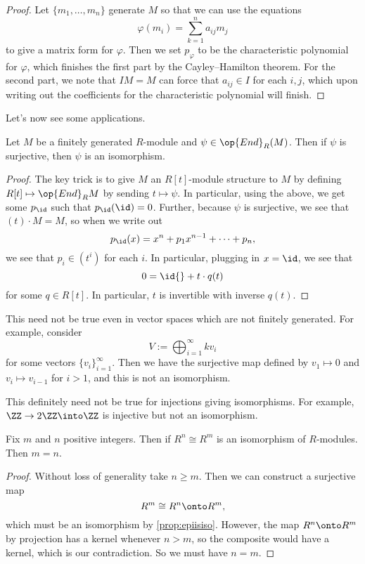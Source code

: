 \begin{proof}
	Let $\{m_1,\ldots,m_n\}$ generate $M$ so that we can use the equations
	\[\varphi(m_i)=\sum_{k=1}^na_{ij}m_j\]
	to give a matrix form for $\varphi$. Then we set $p_\varphi$ to be the characteristic polynomial for $\varphi$, which finishes the first part by the Cayley--Hamilton theorem. For the second part, we note that $IM=M$ can force that $a_{ij}\in I$ for each $i,j$, which upon writing out the coefficients for the characteristic polynomial will finish.
\end{proof}
Let's now see some applications.
\begin{proposition} \label{prop:epiisiso}
	Let $M$ be a finitely generated $R$-module and $\psi\in\op{End}_R(M)$. Then if $\psi$ is surjective, then $\psi$ is an isomorphism.
\end{proposition}
\begin{proof}
	The key trick is to give $M$ an $R[t]$-module structure to $M$ by defining $R[t]\mapsto\op{End}_RM$ by sending $t\mapsto\psi$.
	In particular, using the above, we get some $p_{\id}$ such that $p_{\id}({\id})=0$.
	Further, because $\psi$ is surjective, we see that $(t)\cdot M=M$, so when we write out
	\[p_{\id}(x)=x^n+p_1x^{n-1}+\cdots+p_n,\]
	we see that $p_i\in\left(t^i\right)$ for each $i$. In particular, plugging in $x=\id$, we see that
	\[0=\id{}+t\cdot q(t)\]
	for some $q\in R[t]$. In particular, $t$ is invertible with inverse $q(t)$.
\end{proof}
\begin{remark}
	This need not be true even in vector spaces which are not finitely generated. For example, consider
	\[V:=\bigoplus_{i=1}^\infty kv_i\]
	for some vectors $\{v_i\}_{i=1}^\infty$. Then we have the surjective map defined by $v_1\mapsto0$ and $v_i\mapsto v_{i-1}$ for $i>1$, and this is not an isomorphism.
\end{remark}
\begin{remark}
	This definitely need not be true for injections giving isomorphisms. For example, $\ZZ\to2\ZZ\into\ZZ$ is injective but not an isomorphism.
\end{remark}
\begin{corollary}
	Fix $m$ and $n$ positive integers. Then if $R^n\cong R^m$ is an isomorphism of $R$-modules. Then $m=n$.
\end{corollary}
\begin{proof}
	Without loss of generality take $n\ge m$. Then we can construct a surjective map
	\[R^m\cong R^n\onto R^m,\]
	which must be an isomorphism by \autoref{prop:epiisiso}. However, the map $R^n\onto R^m$ by projection has a kernel whenever $n>m$, so the composite would have a kernel, which is our contradiction. So we must have $n=m$.
\end{proof}

